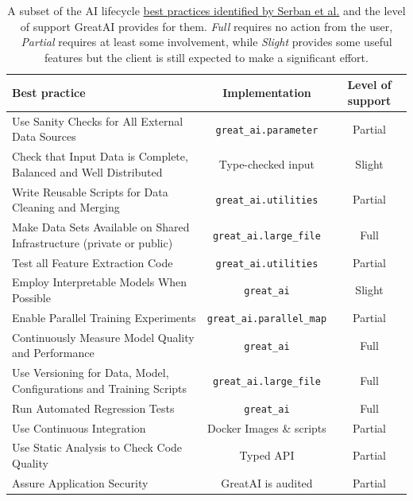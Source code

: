 \begin{table}
\centering
\caption{A subset of the AI lifecycle \href{https://se-ml.github.io/practices/}{best practices identified by Serban et al.} \cite{serban2020adoption,serban2021practices} and the level of support GreatAI provides for them. \textit{Full} requires no action from the user, \textit{Partial} requires at least some involvement, while \textit{Slight} provides some useful features but the client is still expected to make a significant effort.}
\label{table:best-practices}
\begin{tabular}{p{7cm}@{\hskip 0.5cm}c@{\hskip 0.5cm}c}
\hline
\textbf{Best practice} & \textbf{Implementation} & \textbf{Level of support} \\\hline

Use Sanity Checks for All External Data Sources  & \texttt{great\_ai.parameter} & Partial \\\hline
Check that Input Data is Complete, Balanced and Well Distributed  & Type-checked input & Slight \\\hline
Write Reusable Scripts for Data Cleaning and Merging & \texttt{great\_ai.utilities} & Partial \\\hline
Make Data Sets Available on Shared Infrastructure (private or public) & \texttt{great\_ai.large\_file} & Full \\\hline

Test all Feature Extraction Code & \texttt{great\_ai.utilities} & Partial \\\hline
Employ Interpretable Models When Possible & \texttt{great\_ai} & Slight \\\hline
Enable Parallel Training Experiments & \texttt{great\_ai.parallel\_map} & Partial \\\hline
Continuously Measure Model Quality and Performance & \texttt{great\_ai} & Full \\\hline
Use Versioning for Data, Model, Configurations and Training Scripts & \texttt{great\_ai.large\_file} & Full \\\hline

Run Automated Regression Tests & \texttt{great\_ai} & Full \\\hline
Use Continuous Integration & Docker Images \& scripts & Partial \\\hline
Use Static Analysis to Check Code Quality & Typed API & Partial \\\hline
Assure Application Security & GreatAI is audited & Partial \\\hline


\end{tabular}
\end{table}
